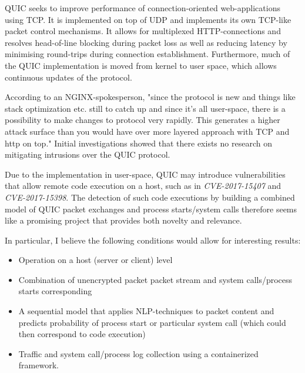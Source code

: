 \documentclass[a4paper,12pt,twoside]{article}
\begin{document}
QUIC seeks to improve performance of connection-oriented web-applications using TCP. It is implemented on top of UDP and implements its own TCP-like packet control mechanisms. It allows for multiplexed HTTP-connections and resolves head-of-line blocking during packet loss as well as reducing latency by minimising round-trips during connection establishment. Furthermore, much of the QUIC implementation is moved from kernel to user space, which allows continuous updates of the protocol.

According to an NGINX-spokesperson, "since the protocol is new and things like stack optimization etc. still to catch up and since it's all user-space, there is a possibility to make changes to protocol very rapidly. This generates a higher attack surface than you would have over more layered approach with TCP and http on top." Initial investigations showed that there exists no research on mitigating intrusions over the QUIC protocol.%

Due to the implementation in user-space, QUIC may introduce vulnerabilities that allow remote code execution on a host, such as in \textit{CVE-2017-15407} and \textit{CVE-2017-15398}. The detection of such code executions by building a combined model of QUIC packet exchanges and process starts/system calls therefore seems like a promising project that provides both novelty and relevance.

In particular, I believe the following conditions would allow for interesting results:
\begin{itemize}
\item Operation on a host (server or client) level
\item Combination of unencrypted packet packet stream and system calls/process starts corresponding
\item A sequential model that applies NLP-techniques to packet content and predicts probability of process start or particular system call (which could then correspond to code execution)
\item Traffic and system call/process log collection using a containerized framework.
\end{itemize}

\end{document}
